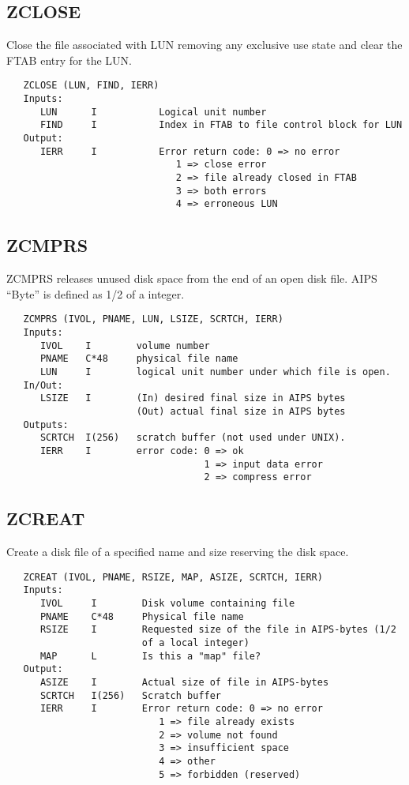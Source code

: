 \subsection{ZCLOSE}
Close the file associated with LUN removing any exclusive use state
and clear the FTAB entry for the LUN.
\begin{verbatim}
   ZCLOSE (LUN, FIND, IERR)
   Inputs:
      LUN      I           Logical unit number
      FIND     I           Index in FTAB to file control block for LUN
   Output:
      IERR     I           Error return code: 0 => no error
                              1 => close error
                              2 => file already closed in FTAB
                              3 => both errors
                              4 => erroneous LUN
\end{verbatim}

\subsection{ZCMPRS}
ZCMPRS releases unused disk space from the end of an open disk file.
AIPS ``Byte'' is defined as 1/2 of a integer.
\begin{verbatim}
   ZCMPRS (IVOL, PNAME, LUN, LSIZE, SCRTCH, IERR)
   Inputs:
      IVOL    I        volume number
      PNAME   C*48     physical file name
      LUN     I        logical unit number under which file is open.
   In/Out:
      LSIZE   I        (In) desired final size in AIPS bytes
                       (Out) actual final size in AIPS bytes
   Outputs:
      SCRTCH  I(256)   scratch buffer (not used under UNIX).
      IERR    I        error code: 0 => ok
                                   1 => input data error
                                   2 => compress error
\end{verbatim}

\subsection{ZCREAT}
Create a disk file of a specified name and size reserving the
disk space.
\begin{verbatim}
   ZCREAT (IVOL, PNAME, RSIZE, MAP, ASIZE, SCRTCH, IERR)
   Inputs:
      IVOL     I        Disk volume containing file
      PNAME    C*48     Physical file name
      RSIZE    I        Requested size of the file in AIPS-bytes (1/2
                        of a local integer)
      MAP      L        Is this a "map" file?
   Output:
      ASIZE    I        Actual size of file in AIPS-bytes
      SCRTCH   I(256)   Scratch buffer
      IERR     I        Error return code: 0 => no error
                           1 => file already exists
                           2 => volume not found
                           3 => insufficient space
                           4 => other
                           5 => forbidden (reserved)
\end{verbatim}

